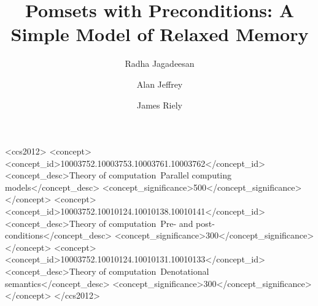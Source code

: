 \documentclass[acmsmall,screen]{acmart}\settopmatter{printfolios=true}
\theoremstyle{acmdefinition}
\begin{document}
\title{Pomsets with Preconditions:
A Simple Model of Relaxed Memory}
\author{Radha Jagadeesan}

\author{Alan Jeffrey}

\author{James Riely}


\begin{abstract}

\end{abstract}

\begin{CCSXML}
<ccs2012>
   <concept>
       <concept_id>10003752.10003753.10003761.10003762</concept_id>
       <concept_desc>Theory of computation~Parallel computing models</concept_desc>
       <concept_significance>500</concept_significance>
       </concept>
   <concept>
       <concept_id>10003752.10010124.10010138.10010141</concept_id>
       <concept_desc>Theory of computation~Pre- and post-conditions</concept_desc>
       <concept_significance>300</concept_significance>
       </concept>
   <concept>
       <concept_id>10003752.10010124.10010131.10010133</concept_id>
       <concept_desc>Theory of computation~Denotational semantics</concept_desc>
       <concept_significance>300</concept_significance>
       </concept>
 </ccs2012>
\end{CCSXML}

\maketitle








\clearpage
\begin{small}

\appendix

\end{small}
\end{document}
